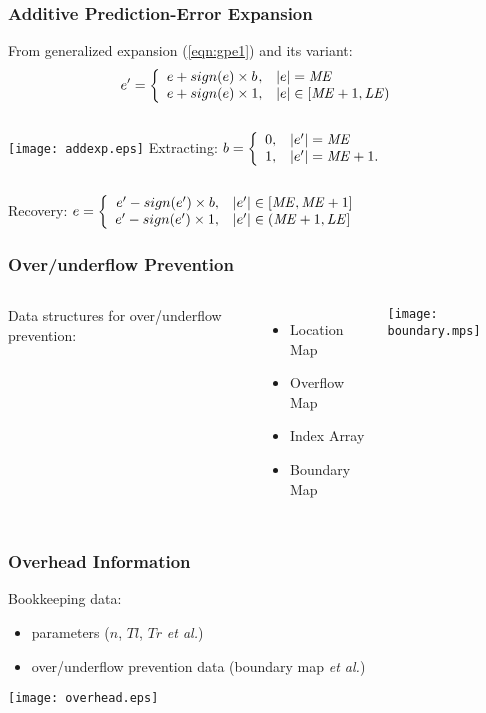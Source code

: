 \documentclass[slidestop,compress]{beamer}
\begin{document}
\begin{frame}
\frametitle{Additive Prediction-Error Expansion}
    From generalized expansion (\ref{eqn:gpe1}) and its variant:
    \begin{equation}\label{eqn:ape}
     e' = \left\{ \begin{array}{l@{,\quad}l}
      e + sign(e) \times b & |e| = \mathit{ME} \\
      e + sign(e) \times 1 & |e| \in [\mathit{ME}+1,\mathit{LE}) \\
    \end{array} \right.
    \end{equation}
    \vspace{-0.3cm}
    \begin{columns}[c]
	    \texttt{[image: addexp.eps]} 
	    Extracting: $ b = \left\{ \begin{array}{r@{,\quad}l}
	      0 & |e'| = \mathit{ME} \\
	      1 & |e'| = \mathit{ME} + 1. \\
	    \end{array} \right. $ \\
    \end{columns}
    Recovery: $ e = \left\{ \begin{array}{r@{,\quad}l}
      e' - sign(e') \times b & |e'| \in [\mathit{ME}, \mathit{ME}+1] \\
      e' - sign(e') \times 1 & |e'| \in (\mathit{ME}+1, \mathit{LE}] \\
    \end{array} \right. $
\end{frame}

\begin{frame}
\frametitle{Over/underflow Prevention}
    \begin{columns}[c]
	Data structures for over/underflow prevention: \\
	    \begin{itemize}
		\item Location Map
		\item Overflow Map
		\item Index Array
		\item Boundary Map
	    \end{itemize}
	    \texttt{[image: boundary.mps]}
    \end{columns}
    \centering
\end{frame}

\begin{frame}
    \frametitle{Overhead Information}
    Bookkeeping data:
    \begin{itemize}
	\item parameters ($n$, $Tl$, $Tr$ \textsl{et al.})
	\item over/underflow prevention data (boundary map \textsl{et al.})
    \end{itemize}
    \centering
    \texttt{[image: overhead.eps]}
\end{frame}
\end{document}

